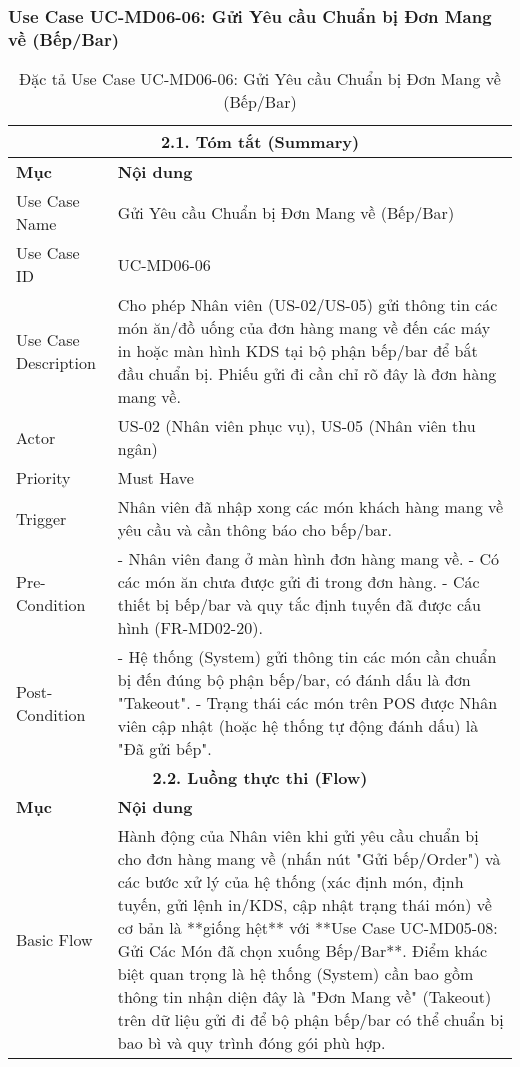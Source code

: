 \subsubsection{Use Case UC-MD06-06: Gửi Yêu cầu Chuẩn bị Đơn Mang về (Bếp/Bar)}
\begin{longtable}{|m{4cm}|p{11cm}|}
\caption{Đặc tả Use Case UC-MD06-06: Gửi Yêu cầu Chuẩn bị Đơn Mang về (Bếp/Bar)} \label{tab:uc_md06_06_final_v3} \\
\hline
\multicolumn{2}{|c|}{\textbf{2.1. Tóm tắt (Summary)}} \\
\hline
\textbf{Mục} & \textbf{Nội dung} \\
\hline
\endhead %
\hline
\endfoot %
\hline
\endlastfoot %
Use Case Name & Gửi Yêu cầu Chuẩn bị Đơn Mang về (Bếp/Bar) \\
\hline
Use Case ID & UC-MD06-06 \\
\hline
Use Case Description & Cho phép Nhân viên (US-02/US-05) gửi thông tin các món ăn/đồ uống của đơn hàng mang về đến các máy in hoặc màn hình KDS tại bộ phận bếp/bar để bắt đầu chuẩn bị. Phiếu gửi đi cần chỉ rõ đây là đơn hàng mang về. \\
\hline
Actor & US-02 (Nhân viên phục vụ), US-05 (Nhân viên thu ngân) \\
\hline
Priority & Must Have \\
\hline
Trigger & Nhân viên đã nhập xong các món khách hàng mang về yêu cầu và cần thông báo cho bếp/bar. \\
\hline
Pre-Condition & - Nhân viên đang ở màn hình đơn hàng mang về. \newline - Có các món ăn chưa được gửi đi trong đơn hàng. \newline - Các thiết bị bếp/bar và quy tắc định tuyến đã được cấu hình (FR-MD02-20). \\
\hline
Post-Condition & - Hệ thống (System) gửi thông tin các món cần chuẩn bị đến đúng bộ phận bếp/bar, có đánh dấu là đơn "Takeout". \newline - Trạng thái các món trên POS được Nhân viên cập nhật (hoặc hệ thống tự động đánh dấu) là "Đã gửi bếp". \\
\hline
\multicolumn{2}{|c|}{\textbf{2.2. Luồng thực thi (Flow)}} \\
\hline
\textbf{Mục} & \textbf{Nội dung} \\
\hline
Basic Flow & Hành động của Nhân viên khi gửi yêu cầu chuẩn bị cho đơn hàng mang về (nhấn nút "Gửi bếp/Order") và các bước xử lý của hệ thống (xác định món, định tuyến, gửi lệnh in/KDS, cập nhật trạng thái món) về cơ bản là **giống hệt** với **Use Case UC-MD05-08: Gửi Các Món đã chọn xuống Bếp/Bar**. \newline Điểm khác biệt quan trọng là hệ thống (System) cần bao gồm thông tin nhận diện đây là "Đơn Mang về" (Takeout) trên dữ liệu gửi đi để bộ phận bếp/bar có thể chuẩn bị bao bì và quy trình đóng gói phù hợp. \\

\end{longtable}
